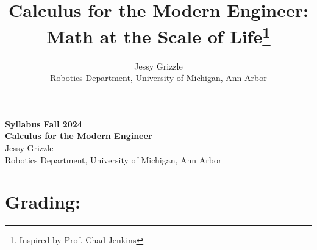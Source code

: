 \documentclass[letterpaper]{book}
\title{Calculus for the Modern Engineer: Math at the Scale of Life\thanks{Inspired by Prof. Chad Jenkins}}
\date{}
\author{Jessy Grizzle\\ Robotics Department, University of Michigan, Ann Arbor}
\begin{document}



\begin{center}
    {\Huge \bf Syllabus Fall 2024\\ Calculus for the Modern Engineer \\}
    {\large Jessy Grizzle\\ Robotics Department, University of Michigan, Ann Arbor}
\end{center}

\bigskip

\section*{Grading:}
\end{document}
